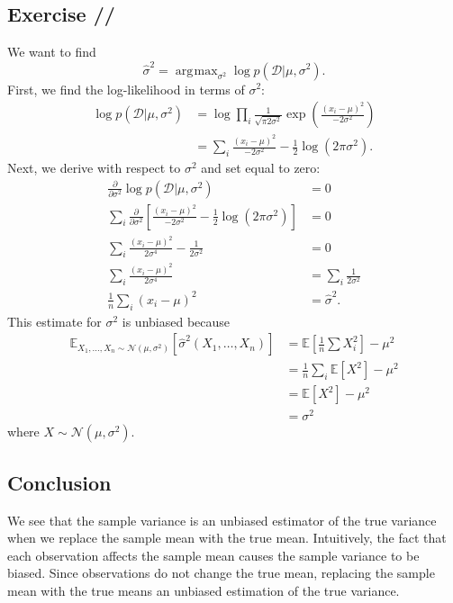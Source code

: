 \documentclass[a4paper,11pt]{article}
\DeclareMathOperator*{\argmax}{arg\!\max}
\newcounter{exercise}
\newcounter{subexercise}
\newcommand*{\exercise}[1][]{\subsection*{Exercise \ifx/#1/\stepcounter{exercise}\arabic{exercise}\else#1\fi}\setcounter{subexercise}{0}}
\begin{document}
\exercise
We want to find
\[
    \hat{\sigma}^2 = \argmax_{\sigma^2}\log p(\mathcal{D}|\mu, \sigma^2).
\]
First, we find the log-likelihood in terms of $\sigma^2$:
\begin{align*}
    \log p(\mathcal{D}|\mu, \sigma^2)
    &= \log\prod\limits_i\frac{1}{\sqrt{\pi2\sigma^2}}
    \exp\left(\frac{(x_i-\mu)^2}{-2\sigma^2}\right) \\
    & = \sum\limits_i\frac{(x_i-\mu)^2}{-2\sigma^2} - \frac{1}{2}\log(2\pi\sigma^2).
\end{align*}
Next, we derive with respect to $\sigma^2$ and set equal to zero:
\begin{align*}
    \frac{\partial}{\partial\sigma^2}\log p(\mathcal{D}|\mu, \sigma^2) & = 0 \\
    \sum\limits_i \frac{\partial}{\partial\sigma^2}
    \left[\frac{(x_i-\mu)^2}{-2\sigma^2}
    -\frac{1}{2}\log(2\pi\sigma^2)\right] & = 0 \\
    \sum\limits_i\frac{(x_i-\mu)^2}{2\sigma^4}
    -\frac{1}{2\sigma^2} & = 0 \\
    \sum\limits_i\frac{(x_i-\mu)^2}{2\sigma^4}
    &=\sum\limits_i\frac{1}{2\sigma^2} \\
    \frac{1}{n}\sum\limits_i(x_i-\mu)^2
    &=\hat\sigma^2. 
\end{align*}
This estimate for $\sigma^2$ is unbiased because
\begin{align*}
    \mathbb{E}_{X_1, \dots, X_n \sim \mathcal{N}(\mu, \sigma^2)}
    [\hat\sigma^2(X_1, \dots, X_n)] & = \mathbb{E}\left[\frac{1}{n}\sum X_i^2\right] - \mu^2 \\
    & = \frac{1}{n}\sum\limits_i\mathbb{E}[X^2] - \mu^2 \\
    & = \mathbb{E}[X^2]-\mu^2 \\
    & = \sigma^2
\end{align*}
where $X \sim \mathcal{N}(\mu, \sigma^2)$.
\subsection*{Conclusion}
We see that the sample variance is an unbiased estimator of the true variance
when we replace the sample mean with the true mean. Intuitively, the fact that each
observation affects the sample mean causes the sample variance to be biased. Since
observations do not change the true mean, replacing the sample mean with the true
means an unbiased estimation of the true variance.
\end{document}
